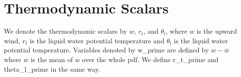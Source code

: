 \section{Thermodynamic Scalars}\label{sec:thermoscalars}

We denote the thermodynamic scalars by $w$, $r_t$, and $\theta_l$, where $w$ is the upward wind, $r_t$ is the liquid water potential
temperature and $\theta_l$ is the liquid water potential temperature\cite[p. 10]{larson2022clubbsilhs}.
Variables denoted by \gls{w_prime} are defined by $w - \overline{w}$ where $\overline{w}$ is the mean of $w$ over the whole pdf.
We define \gls{r_t_prime} and \gls{theta_l_prime} in the same way.